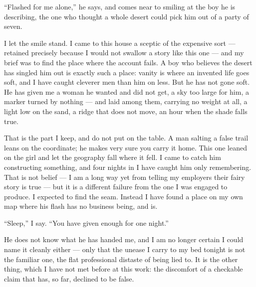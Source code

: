 \ornament

\noindent ``Flashed for me alone,'' he says, and comes near to smiling at the boy he is describing, the one who thought a whole desert could pick him out of a party of seven.\par

I let the smile stand. I came to this house a sceptic of the expensive sort --- retained precisely because I would not swallow a story like this one --- and my brief was to find the place where the account fails. A boy who believes the desert has singled him out is exactly such a place: vanity is where an invented life goes soft, and I have caught cleverer men than him on less. But he has not gone soft. He has given me a woman he wanted and did not get, a sky too large for him, a marker turned by nothing --- and laid among them, carrying no weight at all, a light low on the sand, a ridge that does not move, an hour when the shade falls true.\par

That is the part I keep, and do not put on the table. A man salting a false trail leans on the coordinate; he makes very sure you carry it home. This one leaned on the girl and let the geography fall where it fell. I came to catch him constructing something, and four nights in I have caught him only remembering. That is not belief --- I am a long way yet from telling my employers their fairy story is true --- but it is a different failure from the one I was engaged to produce. I expected to find the seam. Instead I have found a place on my own map where his flash has no business being, and is.\par

``Sleep,'' I say. ``You have given enough for one night.''\par

He does not know what he has handed me, and I am no longer certain I could name it cleanly either --- only that the unease I carry to my bed tonight is not the familiar one, the flat professional distaste of being lied to. It is the other thing, which I have not met before at this work: the discomfort of a checkable claim that has, so far, declined to be false.\par

\ornament
